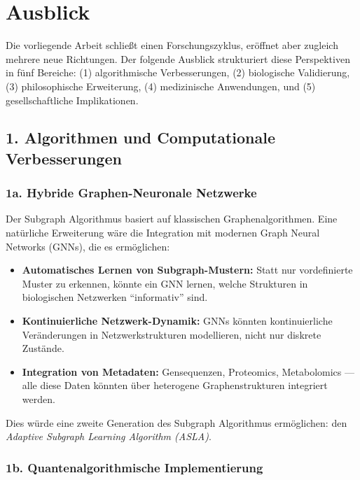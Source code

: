 \documentclass[a4paper,12pt]{article}
\theoremstyle{definition}
\begin{document}
\section{Ausblick}

Die vorliegende Arbeit schließt einen Forschungszyklus, eröffnet aber zugleich mehrere neue Richtungen. Der folgende Ausblick strukturiert diese Perspektiven in fünf Bereiche: (1) algorithmische Verbesserungen, (2) biologische Validierung, (3) philosophische Erweiterung, (4) medizinische Anwendungen, und (5) gesellschaftliche Implikationen.

\subsection{1. Algorithmen und Computationale Verbesserungen}

\subsubsection{1a. Hybride Graphen-Neuronale Netzwerke}

Der Subgraph Algorithmus basiert auf klassischen Graphenalgorithmen. Eine natürliche Erweiterung wäre die Integration mit modernen Graph Neural Networks (GNNs), die es ermöglichen:
\begin{itemize}
    \item \textbf{Automatisches Lernen von Subgraph-Mustern:} Statt nur vordefinierte Muster zu erkennen, könnte ein GNN lernen, welche Strukturen in biologischen Netzwerken ``informativ'' sind.
    
    \item \textbf{Kontinuierliche Netzwerk-Dynamik:} GNNs könnten kontinuierliche Veränderungen in Netzwerkstrukturen modellieren, nicht nur diskrete Zustände.
    
    \item \textbf{Integration von Metadaten:} Gensequenzen, Proteomics, Metabolomics --- alle diese Daten könnten über heterogene Graphenstrukturen integriert werden.
\end{itemize}

Dies würde eine zweite Generation des Subgraph Algorithmus ermöglichen: den \textit{Adaptive Subgraph Learning Algorithm (ASLA)}.

\subsubsection{1b. Quantenalgorithmische Implementierung}
\end{document}
